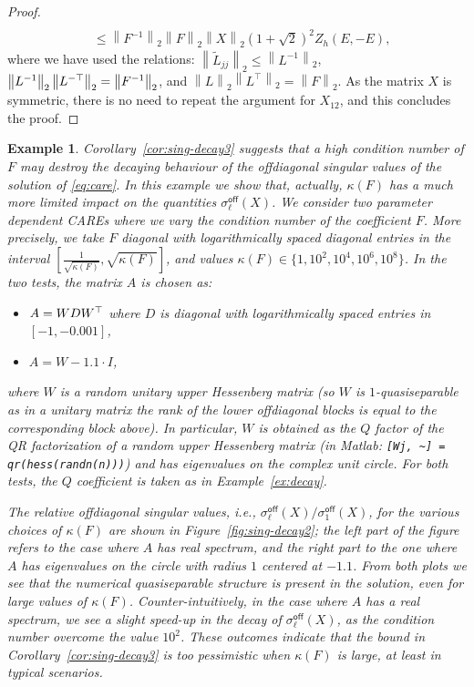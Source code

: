 \documentclass[a4paper,10pt]{article}
\newcommand{\norm}[1]{\left\lVert#1\right\rVert}
\newtheorem{example}{Example}
\newcommand{\upd}[1]{{\color{black}#1}} %
\begin{document}
\begin{proof}
\begin{align*}
		\\ & \le \norm{F^{-1}}_2 \norm{F}_2\norm{X}_2 (1+\sqrt{2})^2
		Z_h(E,-E),
	\end{align*}
	where we have used the relations: $\norm{\widetilde L_{jj}}_2\le \norm{L^{-1}}_2$, $\norm{L^{-1}}_2\norm{L^{-\upd{\top}}}_2= \norm{F^{-1}}_2$, and $\norm{L}_2\norm{L^\top}_2= \norm{F}_2$.
	As the matrix $X$ is symmetric, there is no need to repeat the argument for $X_{12}$,  and this concludes the proof. 
\end{proof}
\begin{example}\label{ex:decay2}
Corollary~\ref{cor:sing-decay3} suggests that a high condition number of $F$ may destroy the decaying behaviour of the offdiagonal singular values of the solution of \eqref{eq:care}. In this example we show that, actually, $\kappa(F)$ has a much more limited impact on the quantities $\sigma_\ell^{\mathsf{off}}(X)$. We consider two parameter dependent CAREs where we vary the condition number of the coefficient $F$.  More precisely, we take $F$ diagonal with logarithmically spaced diagonal entries in the interval $\left[\frac{1}{\sqrt{\kappa(F)}}, \sqrt{\kappa(F)}\right]$, and values $\kappa(F)\in\{1,10^2,10^4, 10^6,10^8\}$. 
In the two tests, the matrix $A$ is chosen as:
\begin{itemize}
	\item $A=WDW\upd{^\top}$ where $D$ is diagonal with logarithmically spaced entries in $[-1,-0.001]$,
	\item $A= W-1.1 \cdot I$,
\end{itemize} 
where $W$ is a random unitary upper Hessenberg matrix (so $W$ is $1$-quasiseparable as in a unitary matrix the rank of the lower offdiagonal blocks is equal to the corresponding block above). In particular, $W$ is obtained as the $Q$ factor of the QR factorization of a random upper Hessenberg matrix (in Matlab: \texttt{[Wj, \textasciitilde ] = qr(hess(randn(n)))}) and has eigenvalues on the complex unit circle.
For both tests, the $Q$ coefficient is taken as in Example~\ref{ex:decay}.

The relative offdiagonal singular values, i.e., $\sigma_\ell^{\mathsf{off}}(X)/\sigma_1^{\mathsf{off}}(X)$, for the various choices of $\kappa(F)$ are shown in Figure~\ref{fig:sing-decay2}; the left part of the figure refers to the case where $A$ has real spectrum, and the right part to the one where $A$ has eigenvalues on the circle with radius $1$ centered at $-1.1$. From both plots we see that the numerical quasiseparable structure is present in the solution, even for large values of $\kappa(F)$. Counter-intuitively, in the case where $A$ has a real spectrum, we see a slight speed-up in the decay of $\sigma_\ell^{\mathsf{off}}(X)$, as the condition number overcome the value $10^2$. These outcomes indicate that the bound in Corollary~\ref{cor:sing-decay3} is too pessimistic when $\kappa(F)$ is large, at least in typical scenarios. 
\end{example}
\end{document}
